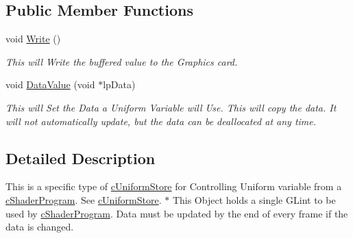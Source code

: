 \subsection*{Public Member Functions}
\begin{DoxyCompactItemize}
\item 
\hypertarget{classc_uniform_int_vector1_ae150c2b2533deb8d05f2a6b59139fd50}{
void \hyperlink{classc_uniform_int_vector1_ae150c2b2533deb8d05f2a6b59139fd50}{Write} ()}
\label{classc_uniform_int_vector1_ae150c2b2533deb8d05f2a6b59139fd50}

\begin{DoxyCompactList}\small\item\em This will Write the buffered value to the Graphics card. \end{DoxyCompactList}\item 
\hypertarget{classc_uniform_int_vector1_aa233d1efbd3a588ca3ddc89c503d4462}{
void \hyperlink{classc_uniform_int_vector1_aa233d1efbd3a588ca3ddc89c503d4462}{DataValue} (void $\ast$lpData)}
\label{classc_uniform_int_vector1_aa233d1efbd3a588ca3ddc89c503d4462}

\begin{DoxyCompactList}\small\item\em This will Set the Data a Uniform Variable will Use. This will copy the data. It will not automatically update, but the data can be deallocated at any time. \end{DoxyCompactList}\end{DoxyCompactItemize}


\subsection{Detailed Description}
This is a specific type of \hyperlink{classc_uniform_store}{cUniformStore} for Controlling Uniform variable from a \hyperlink{classc_shader_program}{cShaderProgram}. See \hyperlink{classc_uniform_store}{cUniformStore}. $\ast$ This Object holds a single GLint to be used by \hyperlink{classc_shader_program}{cShaderProgram}. Data must be updated by the end of every frame if the data is changed. 
